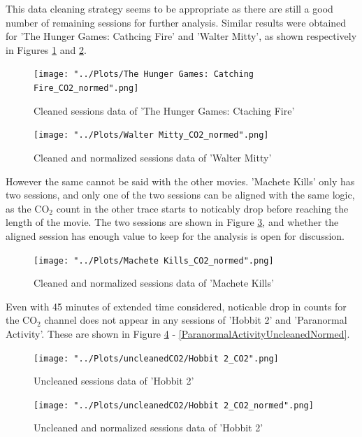 \documentclass[letterpaper, 10 pt, conference]{ieeeconf}  %
\begin{document}
This data cleaning strategy seems to be appropriate as there are still a good number of remaining sessions for further analysis. Similar results were obtained for 'The Hunger Games: Cathcing Fire' and 'Walter Mitty', as shown respectively in Figures \ref{TributeCleanedNormed} and \ref{WalterMittyCleanedNormed}.

\begin{figure}[thpb]
  \centering
  \texttt{[image: "../Plots/The Hunger Games: Catching Fire\_CO2\_normed".png]}
  \caption{Cleaned sessions data of 'The Hunger Games: Ctaching Fire'}
  \label{TributeCleanedNormed}
\end{figure}

\begin{figure}[thpb]
  \centering
  \texttt{[image: "../Plots/Walter Mitty\_CO2\_normed".png]}
  \caption{Cleaned and normalized sessions data of 'Walter Mitty'}
  \label{WalterMittyCleanedNormed}
\end{figure}

However the same cannot be said with the other movies. 'Machete Kills' only has two sessions, and only one of the two sessions can be aligned with the same logic, as the CO$_2$ count in the other trace starts to noticably drop before reaching the length of the movie. The two sessions are shown in Figure \ref{MacheteKillsCleanedNormed}, and whether the aligned session has enough value to keep for the analysis is open for discussion.

\begin{figure}[thpb]
  \centering
  \texttt{[image: "../Plots/Machete Kills\_CO2\_normed".png]}
  \caption{Cleaned and normalized sessions data of 'Machete Kills'}
  \label{MacheteKillsCleanedNormed}
\end{figure}

Even with 45 minutes of extended time considered, noticable drop in counts for the CO$_2$ channel does not appear in any sessions of 'Hobbit 2' and 'Paranormal Activity'. These are shown in Figure \ref{HobbitUncleaned} - \ref{ParanormalActivityUncleanedNormed}.

\begin{figure}[thpb]
  \centering
  \texttt{[image: "../Plots/uncleanedCO2/Hobbit 2\_CO2".png]}
  \caption{Uncleaned sessions data of 'Hobbit 2'}
  \label{HobbitUncleaned}
\end{figure}

\begin{figure}[thpb]
  \centering
  \texttt{[image: "../Plots/uncleanedCO2/Hobbit 2\_CO2\_normed".png]}
  \caption{Uncleaned and normalized sessions data of 'Hobbit 2'}
  \label{HobbitUncleanedNormed}
\end{figure}
\end{document}
